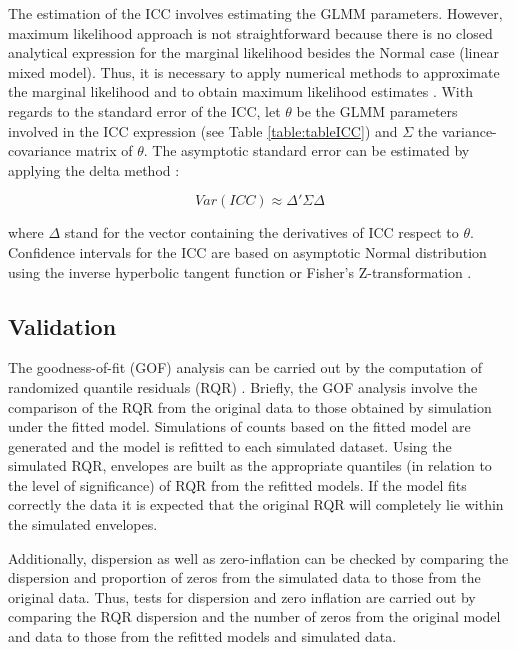 The estimation of the ICC involves estimating the GLMM parameters.
However, maximum likelihood approach is not straightforward because
there is no closed analytical expression for the marginal likelihood
besides the Normal case (linear mixed model). Thus, it is necessary to
apply numerical methods to approximate the marginal likelihood and to
obtain maximum likelihood estimates \citep{Bolker2009}. With regards to
the standard error of the ICC, let \(\theta\) be the GLMM parameters
involved in the ICC expression (see Table \ref{table:tableICC}) and
\(\Sigma\) the variance-covariance matrix of \(\theta\). The asymptotic
standard error can be estimated by applying the delta method
\citep{verHoef2012}:

\begin{equation}
Var\left(ICC\right) \approx \Delta'\Sigma\Delta
\label{eq:varicc}
\end{equation}

where \(\Delta\) stand for the vector containing the derivatives of ICC
respect to \(\theta\). Confidence intervals for the ICC are based on
asymptotic Normal distribution using the inverse hyperbolic tangent
function or Fisher's Z-transformation \citep{carrasco2003}.

\hypertarget{validation}{%
\subsection{Validation}\label{validation}}

The goodness-of-fit (GOF) analysis can be carried out by the computation
of randomized quantile residuals (RQR) \citep{Dunn1996, Feng2020}.
Briefly, the GOF analysis involve the comparison of the RQR from the
original data to those obtained by simulation under the fitted model.
Simulations of counts based on the fitted model are generated and the
model is refitted to each simulated dataset. Using the simulated RQR,
envelopes are built as the appropriate quantiles (in relation to the
level of significance) of RQR from the refitted models. If the model
fits correctly the data it is expected that the original RQR will
completely lie within the simulated envelopes.

Additionally, dispersion as well as zero-inflation can be checked by
comparing the dispersion and proportion of zeros from the simulated data
to those from the original data. Thus, tests for dispersion and zero
inflation are carried out by comparing the RQR dispersion and the number
of zeros from the original model and data to those from the refitted
models and simulated data.

